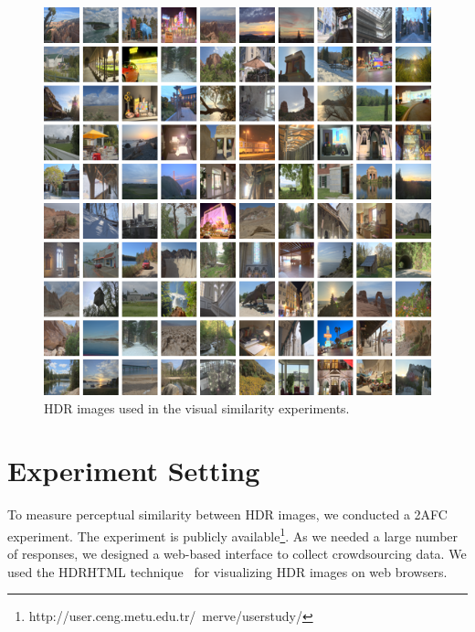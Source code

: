 \begin{figure}
\begin{center}
\includegraphics[width=\textwidth]{figures/chapter3/dataset.png}
\caption{HDR images used in the visual similarity experiments.}
\label{fig:dataset}
\end{center}
\end{figure}


\section{Experiment Setting}
To measure perceptual similarity between HDR images, we conducted a 2AFC experiment. The experiment is publicly available\footnote{http://user.ceng.metu.edu.tr/~merve/userstudy/}. As we needed a large number of responses, we designed a web-based interface to collect crowdsourcing data. We used the HDRHTML technique~\cite{mantiuk2009visualizing} for visualizing HDR images on web browsers.

